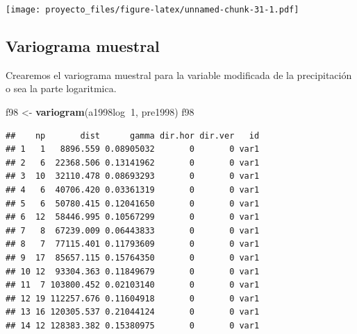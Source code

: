 \documentclass[11pt,]{article}
\newenvironment{Shaded}{\begin{snugshade}}{\end{snugshade}}
\newcommand{\KeywordTok}[1]{\textcolor[rgb]{0.13,0.29,0.53}{\textbf{#1}}}
\newcommand{\DataTypeTok}[1]{\textcolor[rgb]{0.13,0.29,0.53}{#1}}
\newcommand{\DecValTok}[1]{\textcolor[rgb]{0.00,0.00,0.81}{#1}}
\newcommand{\FloatTok}[1]{\textcolor[rgb]{0.00,0.00,0.81}{#1}}
\newcommand{\StringTok}[1]{\textcolor[rgb]{0.31,0.60,0.02}{#1}}
\newcommand{\OperatorTok}[1]{\textcolor[rgb]{0.81,0.36,0.00}{\textbf{#1}}}
\newcommand{\NormalTok}[1]{#1}
\begin{document}
\begin{Shaded}
\end{Shaded}

\texttt{[image: proyecto\_files/figure-latex/unnamed-chunk-31-1.pdf]}

\subsection{Variograma muestral}\label{variograma-muestral}

Crearemos el variograma muestral para la variable modificada de la
precipitación o sea la parte logaritmica.

\begin{Shaded}
\begin{Highlighting}[]
\NormalTok{f98 <-}\StringTok{ }\KeywordTok{variogram}\NormalTok{(a1998log}\OperatorTok{~}\DecValTok{1}\NormalTok{, pre1998)}
\NormalTok{f98}
\end{Highlighting}
\end{Shaded}

\begin{verbatim}
##    np       dist      gamma dir.hor dir.ver   id
## 1   1   8896.559 0.08905032       0       0 var1
## 2   6  22368.506 0.13141962       0       0 var1
## 3  10  32110.478 0.08693293       0       0 var1
## 4   6  40706.420 0.03361319       0       0 var1
## 5   6  50780.415 0.12041650       0       0 var1
## 6  12  58446.995 0.10567299       0       0 var1
## 7   8  67239.009 0.06443833       0       0 var1
## 8   7  77115.401 0.11793609       0       0 var1
## 9  17  85657.115 0.15764350       0       0 var1
## 10 12  93304.363 0.11849679       0       0 var1
## 11  7 103800.452 0.02103140       0       0 var1
## 12 19 112257.676 0.11604918       0       0 var1
## 13 16 120305.537 0.21044124       0       0 var1
## 14 12 128383.382 0.15380975       0       0 var1
\end{verbatim}
\end{document}
